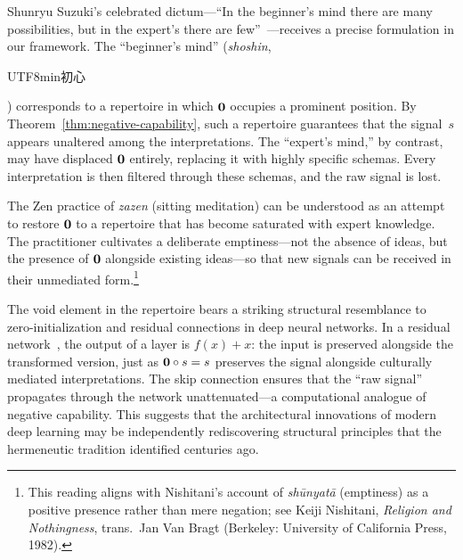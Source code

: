 \begin{example}
\label{ex:beginners-mind}
Shunryu Suzuki's celebrated dictum---``In the beginner's mind there are
many possibilities, but in the expert's there are few''~\cite{suzuki1970}---receives
a precise formulation in our framework.  The ``beginner's mind''
(\emph{shoshin}, \begin{CJK}{UTF8}{min}初心\end{CJK}) corresponds to a
repertoire in which $\mathbf{0}$ occupies a prominent position.  By
Theorem~\ref{thm:negative-capability}, such a repertoire guarantees
that the signal~$s$ appears unaltered among the interpretations.  The
``expert's mind,'' by contrast, may have displaced $\mathbf{0}$ entirely,
replacing it with highly specific schemas.  Every interpretation is
then filtered through these schemas, and the raw signal is lost.

The Zen practice of \emph{zazen} (sitting meditation) can be understood
as an attempt to restore $\mathbf{0}$ to a repertoire that has become
saturated with expert knowledge.  The practitioner cultivates a
deliberate emptiness---not the absence of ideas, but the presence of
$\mathbf{0}$ alongside existing ideas---so that new signals can be received
in their unmediated form.\footnote{This reading aligns with Nishitani's
account of \emph{sh\=unyat\=a} (emptiness) as a positive presence
rather than mere negation; see Keiji Nishitani, \emph{Religion and
Nothingness}, trans.\ Jan Van Bragt (Berkeley: University of California
Press, 1982).}
\end{example}

\begin{remark}
\label{rem:ml-void}
The void element in the repertoire bears a striking structural
resemblance to zero-initialization and residual connections in deep
neural networks.  In a residual network~\cite{he2016resnet}, the output
of a layer is $f(x) + x$: the input is preserved alongside the
transformed version, just as $\mathbf{0} \circ s = s$ preserves the signal
alongside culturally mediated interpretations.  The skip connection
ensures that the ``raw signal'' propagates through the network
unattenuated---a computational analogue of negative capability.  This
suggests that the architectural innovations of modern deep learning may
be independently rediscovering structural principles that the
hermeneutic tradition identified centuries ago.
\end{remark}

